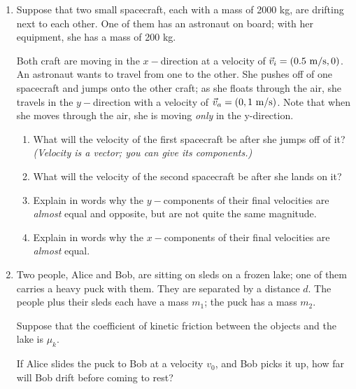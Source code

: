 \documentclass[12pt]{article}
\begin{document}
	\Large
	\centerline{}
	
	\normalsize
	\centerline{}
	
	
	\begin{enumerate}
		

	
	\item Suppose that two small spacecraft, each with a mass of 2000 kg, are drifting next to each other. One of them has an astronaut on board; with her equipment, she has a mass of 200 kg.
	
	Both craft are moving in the $x-$direction at a velocity of $\vec v_i = (0.5~\rm m/\rm s, 0)$. An astronaut wants to travel from one to the other. She pushes off of one spacecraft and jumps onto the other craft; as she floats through the air, she travels in the $y-$direction with a velocity of $\vec v_a = (0, 1~\rm m/\rm s)$. Note that when she moves through the air, she is moving {\it only} in the y-direction.
	
	
	\begin{enumerate}
		\item What will the velocity of the first spacecraft be after she jumps off of it? {\it (Velocity is a vector; you can give its components.)}
		
		
		\item What will the velocity of the second spacecraft be after she lands on it?
		
		
		\item Explain in words why the $y-$components of their final velocities are {\it almost} equal and opposite, but are not quite the same magnitude.
		
		\item Explain in words why the $x-$components of their final velocities are {\it almost} equal.
	\end{enumerate}
	
	\bigskip
	
	
	
\item Two people, Alice and Bob, are sitting on sleds on a frozen lake; one of them carries a heavy puck with them. They are separated by a distance $d$. The people plus their sleds each have a mass $m_1$; the puck has a mass $m_2$.

Suppose that the coefficient of kinetic friction between the objects and the lake is $\mu_k$.

If Alice slides the puck to Bob at a velocity $v_0$, and Bob picks it up, how far will Bob drift before coming to rest?


\end{enumerate}
\end{document}
